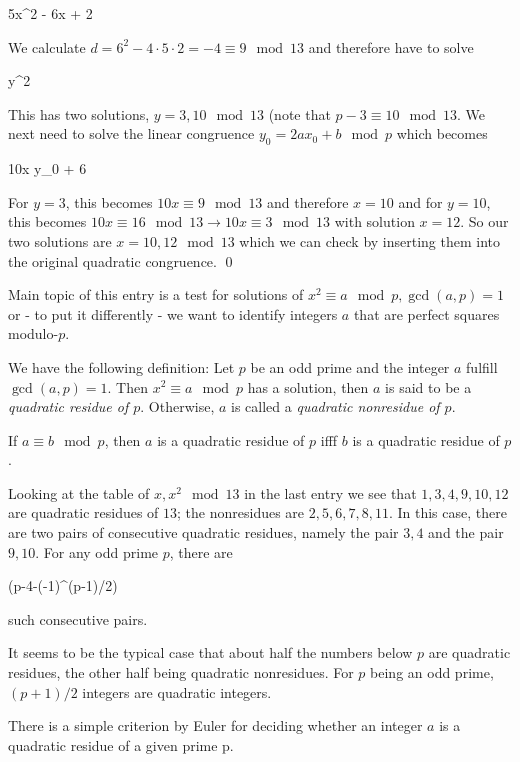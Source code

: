 \bee
5x^2 - 6x + 2  
\eee

We calculate $d = 6^2 - 4\cdot 5 \cdot 2 = -4 \equiv 9 \mod 13$ and therefore have to solve

\bee
y^2  
\eee

This has two solutions, $y = 3, 10 \mod 13$ (note that $p-3 \equiv 10 \mod 13$. We next need to solve the linear congruence $y_0 = 2ax_0 + b \mod p$ which becomes

\bee
10x \equiv y_0 + 6 
\eee

For $y = 3$, this becomes $10 x \equiv 9 \mod 13$ and therefore $x = 10$ and for $y = 10$, this becomes $10x \equiv 16 \mod 13 \rightarrow 10x \equiv 3 \mod 13$ with solution $x = 12$. So our two solutions are $x = 10, 12 \mod 13$ which we can check by inserting them into the original quadratic congruence. \qed

Main topic of this entry is a test for solutions of $x^2 \equiv a \mod p, \gcd(a,p)=1$ or - to put it differently - we want to identify integers $a$ that are perfect squares modulo-$p$.

We have the following definition: Let $p$ be an odd prime and the integer $a$ fulfill $\gcd(a,p) = 1$. Then $x^2 \equiv a \mod p$ has a solution, then $a$ is said to be a \emph{quadratic residue of $p$}. Otherwise, $a$ is called a \emph{quadratic nonresidue of $p$}.

If $a \equiv b \mod p$, then $a$ is a quadratic residue of $p$ ifff $b$ is a quadratic residue of $p$.

Looking at the table of $x, x^2 \mod 13$ in the last entry we see that $1, 3, 4, 9, 10, 12$ are quadratic residues of $13$; the nonresidues are $2,5,6,7,8,11$. In this case, there are two pairs of consecutive quadratic residues, namely the pair $3,4$ and the pair $9,10$. For any odd prime $p$, there are 

\bee
{}(p-4-(-1)^{(p-1)/2})
\eee

such consecutive pairs.

It seems to be the typical case that about half the numbers below $p$ are quadratic residues, the other half being quadratic nonresidues.  For $p$ being an odd prime, $(p+1)/2$ integers are quadratic integers.



There is a simple criterion by Euler for deciding whether an integer $a$ is a quadratic residue of a given prime p.


